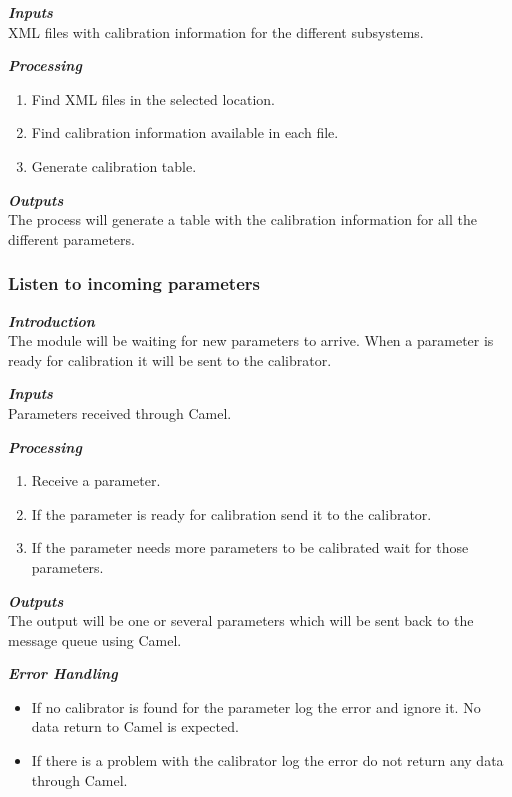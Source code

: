 \textbf{\emph{Inputs}}\\

XML files with calibration information for the different subsystems.

\textbf{\emph{Processing}}\\
\begin{enumerate}
\item Find XML files in the selected location.
\item Find calibration information available in each file.
\item Generate calibration table.
\end{enumerate}

\textbf{\emph{Outputs}}\\

The process will generate a table with the calibration information for all the different parameters.




\subsubsection{Listen to incoming parameters}

\textbf{\emph{Introduction}}\\
The module will be waiting for new parameters to arrive. When a parameter is ready for calibration it will be sent to the calibrator.

\textbf{\emph{Inputs}}\\

Parameters received through Camel.

\textbf{\emph{Processing}}\\
\begin{enumerate}
\item Receive a parameter.
\item If the parameter is ready for calibration send it to the calibrator.
\item If the parameter needs more parameters to be calibrated wait for those parameters.
\end{enumerate}
\pagebreak
\textbf{\emph{Outputs}}\\

The output will be one or several parameters which will be sent back to the message queue using Camel.


\textbf{\emph{Error Handling}}\\
\begin{itemize}
\item If no calibrator is found for the parameter log the error and ignore it. No data return to Camel is expected.
\item If there is a problem with the calibrator log the error do not return any data through Camel.
\end{itemize}


